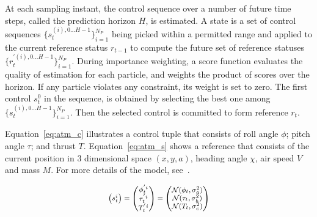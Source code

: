 At each sampling instant, the control sequence over a number of future time steps, called the prediction horizon $H$, is estimated.
A state is a set of control sequences $\{s_t^{(i),0...H-1}\}^{N_P}_{i=1}$ being picked within a permitted range and applied to the current reference status $r_{t-1}$ to compute the future set of reference statuses $\{r_t^{'{(i),0...H-1}}\}^{N_P}_{i=1}$.
During importance weighting, a score function evaluates the quality of estimation for each particle, and weights the product of scores over the horizon.
If any particle violates any constraint, its weight is set to zero.
The first control $s_{t}^0$ in the sequence, is obtained by selecting the best one among $\{s_t^{(i),0...H-1}\}^{N_P}_{i=1}$.
Then the selected control is committed to form reference $r_t$.

Equation~\ref{eq:atm_c} illustrates a control tuple that consists of roll angle $\phi$; pitch angle $\tau$; and thrust $T$.
Equation~\ref{eq:atm_s} shows a reference that consists of the current position in 3 dimensional space $(x,y,a)$, heading angle $\chi$, air speed $V$ and mass $M$. 
For more details of the model, see~\cite{eele13}.

\begin{equation}
\footnotesize
\begin{aligned}
  \begin{pmatrix}
    s^i_{t}    \\ 
  \end{pmatrix}
  =
  \begin{pmatrix}
  	\phi^{'i}_{t} \\
		\tau^{'i}_{t} \\
		T^{'i}_{t} \\
  \end{pmatrix}
  =
  \begin{pmatrix}
  	\mathcal{N}(\phi_{t},\sigma_a^2) \\
  	\mathcal{N}(\tau_{t},\sigma_b^2) \\
  	\mathcal{N}(T_{t},\sigma_c^2) \\
  \end{pmatrix}
\end{aligned}
\label{eq:atm_c}
\end{equation}

